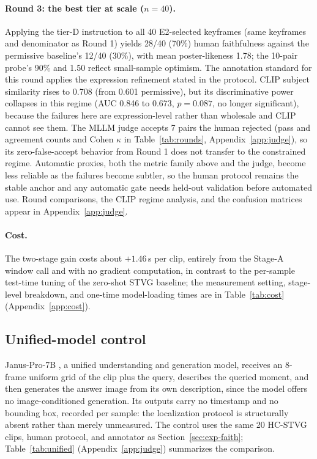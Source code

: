 \documentclass[10pt]{article}
\begin{document}
\paragraph{Round 3: the best tier at scale ($n=40$).}
Applying the tier-D instruction to all 40 E2-selected keyframes (same keyframes and denominator as Round 1) yields 28/40 (70\%) human faithfulness against the permissive baseline's 12/40 (30\%), with mean poster-likeness 1.78; the 10-pair probe's 90\% and 1.50 reflect small-sample optimism. The annotation standard for this round applies the expression refinement stated in the protocol. CLIP subject similarity rises to 0.708 (from 0.601 permissive), but its discriminative power collapses in this regime (AUC 0.846 to 0.673, $p=0.087$, no longer significant), because the failures here are expression-level rather than wholesale and CLIP cannot see them. The MLLM judge accepts 7 pairs the human rejected (pass and agreement counts and Cohen $\kappa$ in Table~\ref{tab:rounds}, Appendix~\ref{app:judge}), so its zero-false-accept behavior from Round 1 does not transfer to the constrained regime. Automatic proxies, both the metric family above and the judge, become less reliable as the failures become subtler, so the human protocol remains the stable anchor and any automatic gate needs held-out validation before automated use. Round comparisons, the CLIP regime analysis, and the confusion matrices appear in Appendix~\ref{app:judge}.

\paragraph{Cost.}
The two-stage gain costs about $+1.46$\,s per clip, entirely from the Stage-A window call and with no gradient computation, in contrast to the per-sample test-time tuning of the zero-shot STVG baseline; the measurement setting, stage-level breakdown, and one-time model-loading times are in Table~\ref{tab:cost} (Appendix~\ref{app:cost}).

\subsection{Unified-model control}\label{sec:exp-unified}

Janus-Pro-7B \citep{januspro2501}, a unified understanding and generation model, receives an 8-frame uniform grid of the clip plus the query, describes the queried moment, and then generates the answer image from its own description, since the model offers no image-conditioned generation. Its outputs carry no timestamp and no bounding box, recorded per sample: the localization protocol is structurally absent rather than merely unmeasured. The control uses the same 20 HC-STVG clips, human protocol, and annotator as Section~\ref{sec:exp-faith}; Table~\ref{tab:unified} (Appendix~\ref{app:judge}) summarizes the comparison.
\end{document}
